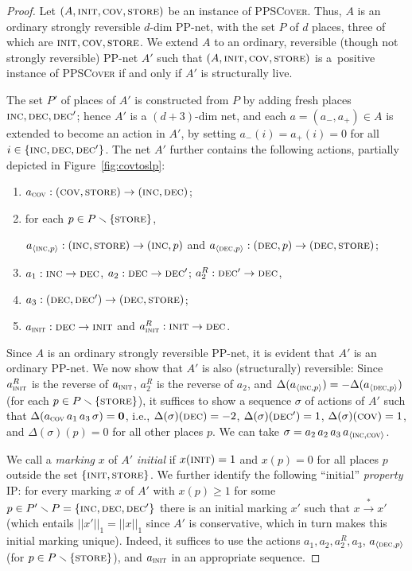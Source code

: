 \documentclass[11pt,a4paper]{amsart}
\newcommand{\step}[1]{\mathrel{\xrightarrow{#1}}}
\newcommand{\reach}{\step{*}}
\newcommand{\PPSCover}{\textsc{PPSCover}\xspace}
\newcommand{\lara}[1]{{\langle #1\rangle}}
\newcommand{\pptrans}[3]{#1:(#2) \rightarrow (#3)}
\newcommand{\pptransone}[3]{#1: #2 \rightarrow #3}
\newcommand{\normone}[1]{||#1||_1}
\newcommand{\pinit}{\textsc{init}}
\newcommand{\pcov}{\textsc{cov}}
\newcommand{\pstore}{\textsc{store}}
\newcommand{\pinc}{\textsc{inc}}
\newcommand{\pdec}{\textsc{dec}}
\let\origtextsc\textsc
\renewcommand{\textsc}[1]{\textnormal{\origtextsc{#1}}}
\theoremstyle{plain}
\theoremstyle{definition}
\theoremstyle{defC}
\theoremstyle{thmC}
\begin{document}
\begin{proof}
	Let $(A,\pinit, \pcov, \pstore)$ be an instance of \PPSCover. Thus, $A$
is an ordinary strongly reversible $d$-dim PP-net, with the set $P$ of
	$d$ places, three of which are 
 $\pinit, \pcov, \pstore$.
	We extend $A$ to an ordinary, reversible (though not
	strongly reversible) PP-net $A'$ such that 
	$(A,\pinit, \pcov, \pstore)$ is a~positive instance of \PPSCover if and
only if $A'$ is structurally live.

The set $P'$ of places of $A'$ is constructed from $P$ by adding 
	fresh places  $\pinc,\pdec,\pdec'$; hence $A'$ is a
	$(d{+}3)$-dim net,  
	and each $a=(a_-,a_+)\in A$ is extended to become an
	action in $A'$, by setting $a_-(i)=a_+(i)=0$ for
	all $i\in\{\pinc,\pdec,\pdec'\}$.
The net $A'$ further contains
the following actions,
partially depicted in Figure~\ref{fig:covtoslp}:
    \begin{enumerate}
        \item 
        $\pptrans{a_\pcov}{\pcov,\pstore}{\pinc,\pdec}$;
\item for each $p \in P \smallsetminus \{\pstore\}$,	    
	\begin{center}
	$\pptrans{a_\lara{\pinc,p}}{\pinc,\pstore}{\pinc,p}$
    and
	$\pptrans{a_\lara{\pdec,p}}{\pdec,p}{\pdec,\pstore}$;
	\end{center}		    
\item        $\pptransone{a_1}{\pinc}{\pdec}$,
		$\pptransone{a_2}{\pdec}{\pdec'}$;
        $\pptransone{a^R_2}{\pdec'}{\pdec}$,
\item
	$\pptrans{a_3}{\pdec,\pdec'}{\pdec,\pstore}$;
        \item 
        $\pptransone{a_\pinit}{\pdec}{\pinit}$
        and
        $\pptransone{a_\pinit^R}{\pinit}{\pdec}$.
    \end{enumerate}
Since $A$ is an ordinary strongly reversible PP-net,
it is evident that $A'$ is an ordinary PP-net. We now show that $A'$
	is also (structurally) reversible:
Since $a^R_\pinit$ is the reverse of $a_\pinit$, 
	$a^R_2$ is the reverse of $a_2$, and
	$\Delta(a_\lara{\pinc,p})=-\Delta(a_\lara{\pdec,p})$ (for each $p\in
	P\smallsetminus\{\pstore\}$),
it suffices to show a sequence $\sigma$ of actions of $A'$ such that 
	$\Delta(a_\pcov\,a_1\,a_3\,\sigma)=\mathbf{0}$, i.e.,
$\Delta(\sigma)(\pdec)=-2$, $\Delta(\sigma)(\pdec')=1$,
	$\Delta(\sigma)(\pcov)=1$, and 
	$\Delta(\sigma)(p)=0$
	for all other places $p$.
We can take 
	$\sigma=a_2\, a_2\, a_3\, a_\lara{\pinc,\pcov}$.

We call a \emph{marking} $x$ of $A'$ \emph{initial} if
$x(\pinit)=1$ and $x(p)=0$ for all places $p$ outside the set
$\{\pinit,\pstore\}$. We further identify the following ``initial'' \emph{property} \textsc{IP}: 
for every marking
	$x$ of $A'$ with $x(p)\geq 1$ for some
	$p\in P'\smallsetminus P=\{\pinc,\pdec,\pdec'\}$ there is  an initial marking $x'$
	such that $x\reach x'$ (which entails
	$\normone{x'}=\normone{x}$ since $A'$ is conservative, which
	in turn makes this initial marking unique).
	 Indeed, it suffices to use the
	actions $a_1,a_2,a^R_2,a_3$, $a_\lara{\pdec,p}$ (for $p\in
	P\smallsetminus\{\pstore\}$), and $a_\pinit$ in an appropriate sequence.


\end{proof}
\end{document}
